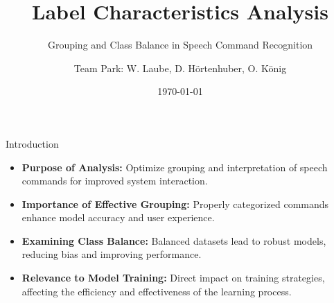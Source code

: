 \documentclass{beamer}
\title{Label Characteristics Analysis}
\subtitle{Grouping and Class Balance in Speech Command Recognition}
\author{Team Park: W. Laube, D. Hörtenhuber, O. König}
\institute{JKU \\ MLPC}
\date{\today}
\begin{document}
\begin{frame}
  \titlepage
\end{frame}

\begin{frame}{Introduction}
  \begin{itemize}
    \item \textbf{Purpose of Analysis:} Optimize grouping and interpretation of speech commands for improved system interaction.
    \item \textbf{Importance of Effective Grouping:} Properly categorized commands enhance model accuracy and user experience.
    \item \textbf{Examining Class Balance:} Balanced datasets lead to robust models, reducing bias and improving performance.
    \item \textbf{Relevance to Model Training:} Direct impact on training strategies, affecting the efficiency and effectiveness of the learning process.
  \end{itemize}
\end{frame}
\end{document}
